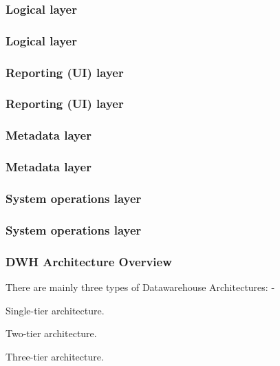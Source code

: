 \subsubsection{Logical layer}

\begin{frame}
\frametitle{Logical layer}
\end{frame}

\subsubsection{Reporting (UI) layer}

\begin{frame}
\frametitle{Reporting (UI) layer}
\end{frame}

\subsubsection{Metadata layer}

\begin{frame}
\frametitle{Metadata layer}
\end{frame}

\subsubsection{System operations layer}

\begin{frame}
\frametitle{System operations layer}
\end{frame}



\begin{frame}
\frametitle{DWH Architecture Overview}
There are mainly three types of Datawarehouse Architectures: -
\begin{wideitemize}
	\item Single-tier architecture.
	\item Two-tier architecture.
	\item Three-tier architecture.
\end{wideitemize}

\end{frame}


